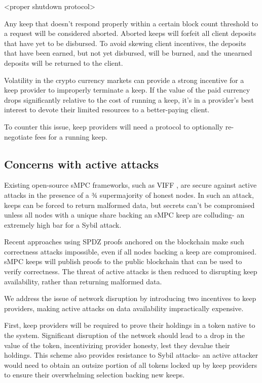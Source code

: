 \documentclass[11pt]{article}
\begin{document}
<proper shutdown protocol>

Any keep that doesn't respond properly within a certain block count
threshold to a request will be considered aborted. Aborted keeps will
forfeit all client deposits that have yet to be disbursed. To avoid
skewing client incentives, the deposits that have been earned, but not
yet disbursed, will be burned, and the unearned deposits will be
returned to the client.

Volatility in the crypto currency markets can provide a strong
incentive for a keep provider to improperly terminate a keep. If the
value of the paid currency drops significantly relative to the cost of
running a keep, it's in a provider's best interest to devote their
limited resources to a better-paying client.

To counter this issue, keep providers will need a protocol to
optionally re-negotiate fees for a running keep.

\subsection{Concerns with active attacks}

Existing open-source sMPC frameworks, such as VIFF \cite{viff}, are
secure against active attacks in the presence of a ¾ supermajority of
honest nodes. In such an attack, keeps can be forced to return
malformed data, but secrets can't be compromised unless all nodes with
a unique share backing an sMPC keep are colluding- an extremely high
bar for a Sybil attack.

Recent approaches using SPDZ proofs \cite{spdz} anchored on the
blockchain \cite{bitcoinSmpc, blockchainMultipartyComputation} make
such correctness attacks impossible, even if all nodes backing a keep
are compromised. sMPC keeps will publish proofs to the public
blockchain that can be used to verify correctness. The threat of
active attacks is then reduced to disrupting keep availability, rather
than returning malformed data.

We address the issue of network disruption by introducing two
incentives to keep providers, making active attacks on data
availability impractically expensive.

First, keep providers will be required to prove their holdings in a
token native to the system. Significant disruption of the network
should lead to a drop in the value of the token, incentivizing
provider honesty, lest they devalue their holdings. This scheme also
provides resistance to Sybil attacks- an active attacker would need to
obtain an outsize portion of all tokens locked up by keep providers to
ensure their overwhelming selection backing new keeps.
\end{document}
